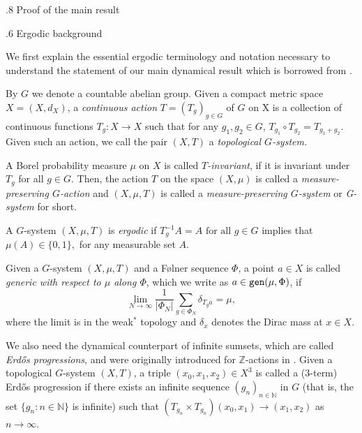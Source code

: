 \documentclass[reqno]{amsart}
\makeatletter
\def\Z{{\mathbb Z}}
\def\N{{\mathbb N}}
\theoremstyle{definition}
\theoremstyle{remark}
\def\section{\@startsection{section}{1}%
  \z@{.5\linespacing\@plus.7\linespacing}
{.8\baselineskip}%
  {\normalfont\fontsize{11}{13}\centering\bfseries}%
}
\def\subsection{\@startsection{subsection}{2}%
  \z@{.4\linespacing\@plus.7\linespacing}
{.6\baselineskip}%
  {\normalfont\centering\bfseries}%
}
\theoremstyle{remark}
\def\N{{\mathbb N}}
\newcommand{\xmt}{(X,\mu,T)}
\newcommand{\gen}{\texttt{\textup{gen}}}
\newcommand{\Folner}{F\o{}lner}
\makeatother
\begin{document}
\section{Proof of the main result}\label{sec proof}

\subsection{Ergodic background}

We first explain the essential ergodic terminology and
notation necessary to understand the statement of our main 
dynamical result which is borrowed from 
\cite{charamaras_kousek_mountakis_radic2025BBingroups}. 

By $G$ we denote a countable abelian group. Given a compact 
metric space $X=(X,d_X)$, 
a \textit{continuous action} $T=(T_g)_{g\in G}$ of $G$ on X
is a collection of continuous functions $T_g:X\to X$ such 
that 
for any $g_1, g_2 \in G$, $T_{g_1} \circ T_{g_2} = T_{g_1+g_2}$.
Given such an action, we call the pair $(X,T)$ a \textit{topological $G$-system.}

A Borel probability measure $\mu$ on $X$ is called 
\textit{$T$-invariant}, if it is invariant under $T_g$ for 
all $g\in G$. 
Then, the action $T$ on the space 
$(X,\mu)$ is called a \textit{measure-preserving $G$-action} 
and $\xmt$ is called a \textit{measure-preserving $G$-system} or \textit{G-system} for short. 

A $G$-system $\xmt$ is \textit{ergodic} 
if $ T_g ^{-1} A =A \text{ for all } g\in G$ implies that $\mu(A) \in \{0,1\},$ 
for any measurable set $A$.

Given a $G$-system $\xmt$ and a \Folner{} sequence $\Phi$, a point $a\in X$ is called 
\textit{generic with respect to $\mu$ along $\Phi$}, which we write as $a\in \gen(\mu,\Phi)$, if 
$$ \lim_{N\to \infty} \frac{1}{| \Phi_N|} \sum_{g\in \Phi_N}
\delta_{T_g a}=\mu,$$
where the limit 
is in the weak$^\ast$ topology and $\delta_x$ denotes the 
Dirac mass at $x\in X$.

We also need the dynamical counterpart of infinite 
sumsets, which are called \textit{Erd\H{o}s progressions}, 
and were originally introduced for $\Z$-actions in 
\cite{Kra_Moreira_Richter_Robertson:2023}.
Given a topological $G$-system $(X,T)$, a triple 
$(x_0,x_1,x_2) \in X^3$ is called a 
($3$-term) Erd\H{o}s progression if there exists 
an infinite sequence $(g_n)_{n\in \N}$ in $G$ (that is, the set 
$\{g_n : n\in \N\}$ is infinite)
such that $(T_{g_n} \times T_{g_n})(x_0,x_1) \xrightarrow{} (x_1,x_2)$ 
as $n\to \infty$.
\end{document}
